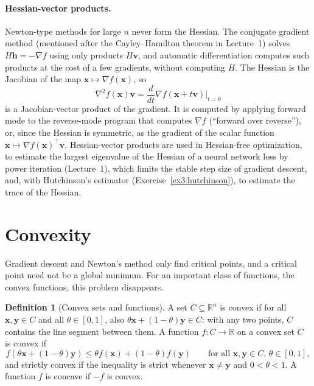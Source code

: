 \documentclass[11pt]{article}
\theoremstyle{definition}
\newtheorem{definition}{Definition}[section]
\theoremstyle{plain}
\theoremstyle{remark}
\begin{document}
\paragraph{Hessian-vector products.} Newton-type methods for large $n$ never form the Hessian. The conjugate gradient method (mentioned after the Cayley--Hamilton theorem in Lecture~1) solves $H\mathbf{h} = -\nabla f$ using only products $H\mathbf{v}$, and automatic differentiation computes such products at the cost of a few gradients, without computing $H$. The Hessian is the Jacobian of the map $\mathbf{x} \mapsto \nabla f(\mathbf{x})$, so
\[\nabla^2 f(\mathbf{x})\mathbf{v} = \frac{d}{dt}\nabla f(\mathbf{x} + t\mathbf{v})\Big|_{t=0}\]
is a Jacobian-vector product of the gradient. It is computed by applying forward mode to the reverse-mode program that computes $\nabla f$ (``forward over reverse''), or, since the Hessian is symmetric, as the gradient of the scalar function $\mathbf{x} \mapsto \nabla f(\mathbf{x})^\top\mathbf{v}$. Hessian-vector products are used in Hessian-free optimization, to estimate the largest eigenvalue of the Hessian of a neural network loss by power iteration (Lecture~1), which limits the stable step size of gradient descent, and, with Hutchinson's estimator (Exercise~\ref{ex3:hutchinson}), to estimate the trace of the Hessian.

\section{Convexity}\label{sec:convexity}

Gradient descent and Newton's method only find critical points, and a critical point need not be a global minimum. For an important class of functions, the convex functions, this problem disappears.

\begin{definition}[Convex sets and functions]\label{def:convex}
    A set $C \subseteq \mathbb{R}^n$ is convex if for all $\mathbf{x}, \mathbf{y} \in C$ and all $\theta \in [0, 1]$, also $\theta\mathbf{x} + (1 - \theta)\mathbf{y} \in C$: with any two points, $C$ contains the line segment between them. A function $f: C \to \mathbb{R}$ on a convex set $C$ is convex if
    \[f(\theta\mathbf{x} + (1 - \theta)\mathbf{y}) \leq \theta f(\mathbf{x}) + (1 - \theta)f(\mathbf{y}) \qquad \text{for all } \mathbf{x}, \mathbf{y} \in C, \, \theta \in [0, 1],\]
    and strictly convex if the inequality is strict whenever $\mathbf{x} \neq \mathbf{y}$ and $0 < \theta < 1$. A function $f$ is concave if $-f$ is convex.
\end{definition}
\end{document}
